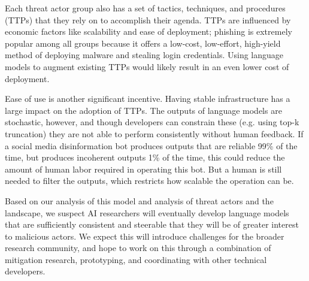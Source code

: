 Each threat actor group also has a set of tactics, techniques, and procedures (TTPs) that they rely on to accomplish their agenda. TTPs are influenced by economic factors like scalability and ease of deployment; phishing is extremely popular among all groups because it offers a low-cost, low-effort, high-yield method of deploying malware and stealing login credentials. Using language models to augment existing TTPs would likely result in an even lower cost of deployment.

Ease of use is another significant incentive. Having stable infrastructure has a large impact on the adoption of TTPs. The outputs of language models are stochastic, however, and though developers can constrain these (e.g. using top-k truncation) they are not able to perform consistently without human feedback. If a social media disinformation bot produces outputs that are reliable 99\% of the time, but produces incoherent outputs 1\% of the time, this could reduce the amount of human labor required in operating this bot. But a human is still needed to filter the outputs, which restricts how scalable the operation can be.

Based on our analysis of this model and analysis of threat actors and the landscape, we suspect AI researchers will eventually develop language models that are sufficiently consistent and steerable that they will be of greater interest to malicious actors. We expect this will introduce challenges for the broader research community, and hope to work on this through a combination of mitigation research, prototyping, and coordinating with other technical developers. 

